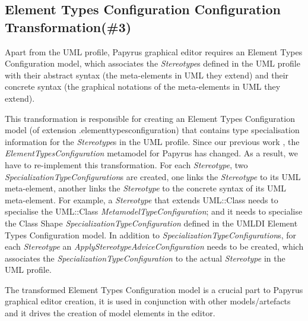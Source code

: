 \subsection{Element Types Configuration Configuration Transformation(\#3)}
\label{sec:elementTypes}
Apart from the UML profile, Papyrus graphical editor requires an Element Types Configuration model, which associates the \textit{Stereotype}s defined in the UML profile with their abstract syntax (the meta-elements in UML they extend) and their concrete syntax (the graphical notations of the meta-elements in UML they extend). 

This transformation is responsible for creating an Element Types Configuration model (of extension .elementtypesconfiguration) that contains type specialisation information for the \textit{Stereotype}s in the UML profile. 
Since our previous work \cite{zolotas2018towards}, the \textit{ElementTypesConfiguration} metamodel for Papyrus has changed. 
As a result, we have to re-implement this transformation. 
For each \textit{Stereotype}, two \textit{SpecializationTypeConfiguration}s are created, one links the \textit{Stereotype} to its UML meta-element, another links the \textit{Stereotype} to the concrete syntax of its UML meta-element.
For example, a \textit{Stereotype} that extends UML::Class needs to specialise the UML::Class \textit{MetamodelTypeConfiguration}; and it needs to specialise the Class Shape \textit{SpecializationTypeConfiguration} defined in the UMLDI Element Types Configuration model. 
In addition to \textit{SpecializationTypeConfiguration}s, for each \textit{Stereotype} an \textit{ApplyStereotypeAdviceConfiguration} needs to be created, which associates the \textit{SpecializationTypeConfiguration} to the actual \textit{Stereotype} in the UML profile.

The transformed Element Types Configuration model is a crucial part to Papyrus graphical editor creation, it is used in conjunction with other models/artefacts and it drives the creation of model elements in the editor.

